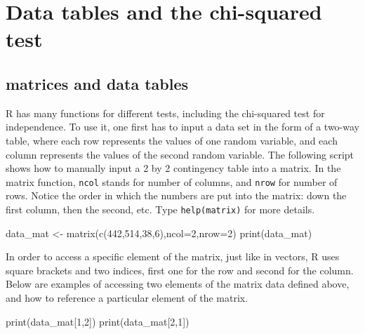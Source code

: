 \documentclass[
  letterpaper,
  DIV=11,
  numbers=noendperiod]{scrreprt}
\newenvironment{Shaded}{\begin{snugshade}}{\end{snugshade}}
\newcommand{\NormalTok}[1]{\textcolor[rgb]{0.00,0.23,0.31}{#1}}
\begin{document}
\hypertarget{data-tables-and-the-chi-squared-test}{%
\section*{Data tables and the chi-squared
test}\label{data-tables-and-the-chi-squared-test}}


\hypertarget{matrices-and-data-tables}{%
\subsection*{matrices and data tables}\label{matrices-and-data-tables}}

R has many functions for different tests, including the chi-squared test
for independence. To use it, one first has to input a data set in the
form of a two-way table, where each row represents the values of one
random variable, and each column represents the values of the second
random variable. The following script shows how to manually input a 2 by
2 contingency table into a matrix. In the matrix function, \texttt{ncol}
stands for number of columns, and \texttt{nrow} for number of rows.
Notice the order in which the numbers are put into the matrix: down the
first column, then the second, etc. Type \texttt{help(matrix)} for more
details.

\begin{Shaded}
\begin{Highlighting}[]
\NormalTok{data\_mat \textless{}{-} matrix(c(442,514,38,6),ncol=2,nrow=2)}
\NormalTok{print(data\_mat)}
\end{Highlighting}
\end{Shaded}

In order to access a specific element of the matrix, just like in
vectors, R uses square brackets and two indices, first one for the row
and second for the column. Below are examples of accessing two elements
of the matrix data defined above, and how to reference a particular
element of the matrix.

\begin{Shaded}
\begin{Highlighting}[]
\NormalTok{print(data\_mat[1,2])}
\NormalTok{print(data\_mat[2,1])}
\end{Highlighting}
\end{Shaded}
\end{document}

